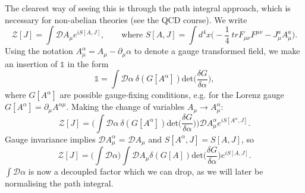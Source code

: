 The clearest way of seeing this is through the path integral approach, which is necessary for non-abelian theories (see the QCD course). We write 
\begin{equation}
\mathcal{Z}[J] = \int\mathcal{D} A_\mu e^{iS[A,J]}, \qquad \text{where } S[A,J] = \int d^4x \bigg(-\frac{1}{4}\ tr F_{\mu \nu}F^{\mu \nu} - J_\mu^a A_\mu^a \bigg).
\end{equation}
Using the notation $A_\mu^\alpha = A_\mu - \partial_\mu \alpha$ to denote a gauge transformed field, we make an insertion of $\mathds{1}$ in the form
\begin{equation}
\mathds{1} = \int \mathcal{D}\alpha\ \delta ( G[A^\alpha]) \text{det}\bigg(\frac{\delta G}{\delta \alpha} \bigg),
\end{equation}
where $G[A^\alpha]$ are possible gauge-fixing conditions, e.g. for the Lorenz gauge $G[A^\alpha] = \partial_\mu A^{\alpha \mu}$. Making the change of variables $A_\mu \to A_\mu^\alpha$:
\begin{equation}
\mathcal{Z}[J] = \bigg( \int \mathcal{D}\alpha\ \delta ( G[A^\alpha]) \text{det}\bigg(\frac{\delta G}{\delta \alpha} \bigg)\bigg) \mathcal{D}A^\alpha_\mu e^{i S[A^\alpha,J]}.
\end{equation}
Gauge invariance implies $\mathcal{D}A_\mu^\alpha$ = $\mathcal{D}A_\mu$ and $S[A^\alpha, J] = S[A,J]$, so
\begin{equation}
\mathcal{Z}[J] = \bigg( \int \mathcal{D} \alpha \bigg) \int \mathcal{D} A_\mu \delta(G[A]) \text{det} \bigg(\frac{\delta G}{\delta \alpha} \bigg) e^{iS[A,J]}.
\end{equation}
$\int \mathcal{D} \alpha$ is now a decoupled factor which we can drop, as we will later be normalising the path integral. 

